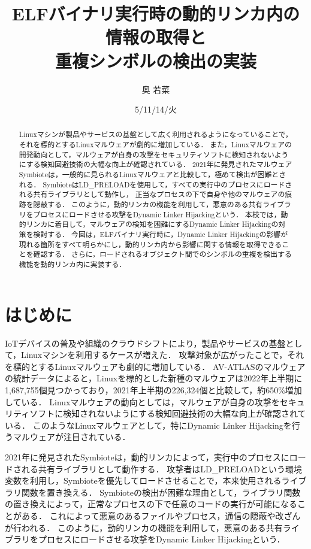 \documentclass[submit,techreq,noauthor]{eco}	%
\begin{document}
\date   {5/11/14/火}				%
\title  {ELFバイナリ実行時の動的リンカ内の情報の取得と\\重複シンボルの検出の実装}	%
\author {奥 若菜}				%


\begin{abstract}
	Linuxマシンが製品やサービスの基盤として広く利用されるようになっていることで，それを標的とするLinuxマルウェアが劇的に増加している．
  また，Linuxマルウェアの開発動向として，マルウェアが自身の攻撃をセキュリティソフトに検知されないようにする検知回避技術の大幅な向上が確認されている．
  2021年に発見されたマルウェアSymbioteは，一般的に見られるLinuxマルウェアと比較して，極めて検出が困難とされる．
  SymbioteはLD\_PRELOADを使用して，すべての実行中のプロセスにロードされる共有ライブラリとして動作し，
  正当なプロセスの下で自身や他のマルウェアの痕跡を隠蔽する．
  このように，動的リンカの機能を利用して，悪意のある共有ライブラリをプロセスにロードさせる攻撃をDynamic Linker Hijackingという．
  本校では，動的リンカに着目して，マルウェアの検知を困難にするDynamic Linker Hijackingの対策を検討する．
  今回は，ELFバイナリ実行時に，Dynamic Linker Hijackingの影響が現れる箇所をすべて明らかにし，動的リンカ内から影響に関する情報を取得できることを確認する．
  さらに，ロードされるオブジェクト間でのシンボルの重複を検出する機能を動的リンカ内に実装する．
\end{abstract}
\maketitle


\section{はじめに}
  IoTデバイスの普及や組織のクラウドシフトにより，製品やサービスの基盤として，Linuxマシンを利用するケースが増えた．
  攻撃対象が広がったことで，それを標的とするLinuxマルウェアも劇的に増加している．
  AV-ATLASのマルウェアの統計データによると，Linuxを標的とした新種のマルウェアは2022年上半期に1,687,755個見つかっており，2021年上半期の226,324個と比較して，約650\%増加している\cite{AV-TEST}．
  Linuxマルウェアの動向としては，マルウェアが自身の攻撃をセキュリティソフトに検知されないようにする検知回避技術の大幅な向上が確認されている\cite{IBM}．
  このようなLinuxマルウェアとして，特にDynamic Linker Hijackingを行うマルウェアが注目されている．

  2021年に発見されたSymbiote\cite{Symbiote}は，動的リンカによって，実行中のプロセスにロードされる共有ライブラリとして動作する．
  攻撃者はLD\_PRELOADという環境変数を利用し，Symbioteを優先してロードさせることで，本来使用されるライブラリ関数を置き換える．
  Symbioteの検出が困難な理由として，ライブラリ関数の置き換えによって，正常なプロセスの下で任意のコードの実行が可能になることがある．
  これによって悪意のあるファイルやプロセス，通信の隠蔽や改ざんが行われる．
  このように，動的リンカの機能を利用して，悪意のある共有ライブラリをプロセスにロードさせる攻撃をDynamic Linker Hijackingという．
\end{document}

